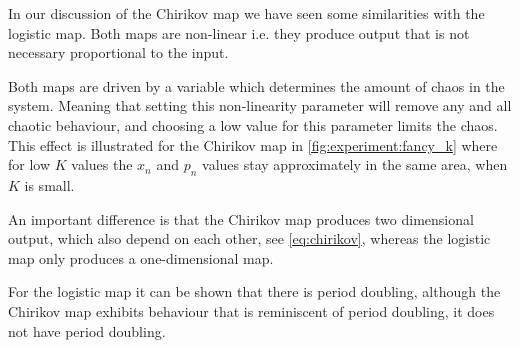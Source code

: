 In our discussion of the Chirikov map we have seen some similarities with the logistic map. Both maps are non-linear i.e. they produce output that is not necessary proportional to the input. 

Both maps are driven by a variable which determines the amount of chaos in the system. Meaning that setting this non-linearity parameter will remove any and all chaotic behaviour, and choosing a low value for this parameter limits the chaos. This effect is illustrated for the Chirikov map in \cref{fig:experiment:fancy_k} where for low $K$ values the $x_n$ and $p_n$ values stay approximately in the same area, when $K$ is small. 

An important difference is that the Chirikov map produces two dimensional output, which also depend on each other, see \eqref{eq:chirikov}, whereas the logistic map only produces a one-dimensional map. 

For the logistic map it can be shown that there is period doubling, although the Chirikov map exhibits behaviour that is reminiscent of period doubling, it does not have period doubling. 

